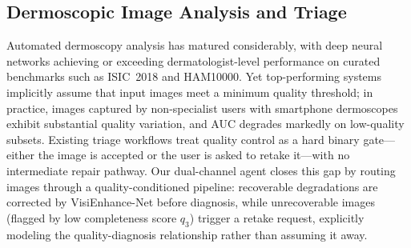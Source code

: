 \subsection{Dermoscopic Image Analysis and Triage}
\label{sec:related:dermoscopy}

Automated dermoscopy analysis has matured considerably, with deep neural networks achieving or exceeding dermatologist-level performance on curated benchmarks such as ISIC~2018 and HAM10000.
Yet top-performing systems implicitly assume that input images meet a minimum quality threshold; in practice, images captured by non-specialist users with smartphone dermoscopes exhibit substantial quality variation, and AUC degrades markedly on low-quality subsets.
Existing triage workflows treat quality control as a hard binary gate—either the image is accepted or the user is asked to retake it—with no intermediate repair pathway.
Our dual-channel agent closes this gap by routing images through a quality-conditioned pipeline: recoverable degradations are corrected by VisiEnhance-Net before diagnosis, while unrecoverable images (flagged by low completeness score $q_3$) trigger a retake request, explicitly modeling the quality-diagnosis relationship rather than assuming it away.
